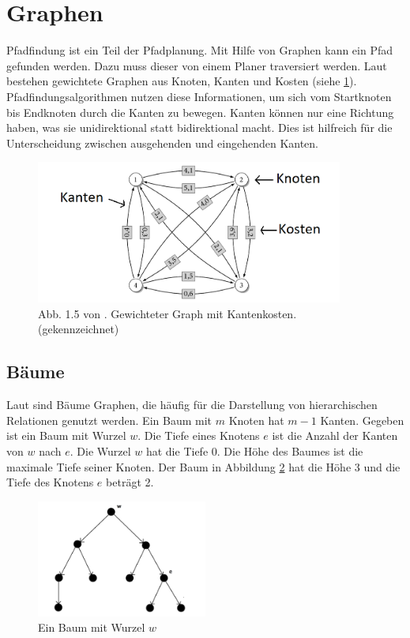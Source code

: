 \section{Graphen}
Pfadfindung ist ein Teil der Pfadplanung. Mit Hilfe von Graphen kann ein Pfad gefunden werden. Dazu muss dieser von einem Planer traversiert werden. Laut \cite{Turau:15} bestehen gewichtete Graphen aus Knoten, Kanten und Kosten (siehe \ref{sec0a}). Pfadfindungsalgorithmen nutzen diese Informationen, um sich vom Startknoten bis Endknoten durch die Kanten zu bewegen. Kanten können nur eine Richtung haben, was sie unidirektional statt bidirektional macht. Dies ist hilfreich für die Unterscheidung zwischen ausgehenden und eingehenden Kanten.

\begin{figure} %
	\centering
	\includegraphics[width=0.9\textwidth]{images/kk_graph_S6.png}
	\caption{Abb. 1.5 von \cite[~S. 6]{Turau:15}. Gewichteter Graph mit Kantenkosten.(gekennzeichnet)}
	\label{sec0a}
\end{figure}

\subsection{Bäume}
Laut \cite{Turau:15} sind Bäume Graphen, die häufig für die Darstellung von hierarchischen Relationen genutzt werden. Ein Baum mit $m$ Knoten hat $m-1$ Kanten.
Gegeben ist ein Baum mit Wurzel $w$. Die Tiefe eines Knotens $e$ ist die Anzahl der Kanten von $w$ nach $e$. Die Wurzel $w$ hat die Tiefe 0. Die Höhe des Baumes ist die maximale Tiefe seiner Knoten.  Der Baum in Abbildung \ref{sec0b} hat die Höhe 3 und die Tiefe des Knotens $e$ beträgt 2.

\begin{figure} %
	\centering
	\includegraphics[width=0.5\textwidth]{images/Tree_Graph.png}
	\caption{Ein Baum mit Wurzel $w$}
	\label{sec0b}
\end{figure}

